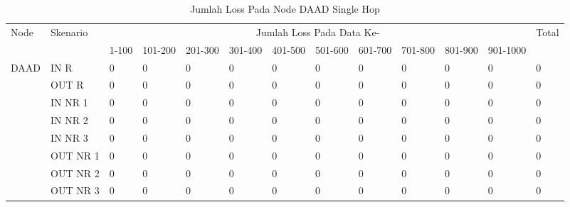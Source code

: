 \begin{table}[H]
  \centering
  \caption{Jumlah Loss Pada Node DAAD Single Hop}
    \begin{tabular}{|p{1cm}|p{1.9cm}|p{0.6cm}|p{0.6cm}|p{0.6cm}|p{0.6cm}|p{0.6cm}|p{0.6cm}|p{0.6cm}|p{0.6cm}|p{0.6cm}|p{0.6cm}|p{1cm}|}
    \hline
        \multirow{2}{*}{Node}&\multirow{2}{*}{Skenario}&\multicolumn{10}{|c|}{Jumlah Loss Pada Data Ke-}&\multirow{2}{*}{Total} \\\cline{3-12}
          & & 1-100 & 101-200 & 201-300 & 301-400 & 401-500 & 501-600 & 601-700 & 701-800 & 801-900 & 901-1000 & \\
        \hline
    \multirow{8}{*}{DAAD}  
    & IN R  & 0     & 0     & 0     & 0     & 0     & 0     & 0     & 0     & 0     & 0     & 0 \\
          & OUT R & 0     & 0     & 0     & 0     & 0     & 0     & 0     & 0     & 0     & 0     & 0 \\
          & IN NR 1 & 0     & 0     & 0     & 0     & 0     & 0     & 0     & 0     & 0     & 0     & 0 \\
          & IN NR 2 & 0     & 0     & 0     & 0     & 0     & 0     & 0     & 0     & 0     & 0     & 0 \\
          & IN NR 3 & 0     & 0     & 0     & 0     & 0     & 0     & 0     & 0     & 0     & 0     & 0 \\
          & OUT NR 1 & 0     & 0     & 0     & 0     & 0     & 0     & 0     & 0     & 0     & 0     & 0 \\
          & OUT NR 2 & 0     & 0     & 0     & 0     & 0     & 0     & 0     & 0     & 0     & 0     & 0 \\
          & OUT NR 3 & 0     & 0     & 0     & 0     & 0     & 0     & 0     & 0     & 0     & 0     & 0 \\
    
    \hline
    \end{tabular}%
  \label{tab:addlabel}%
\end{table}%
